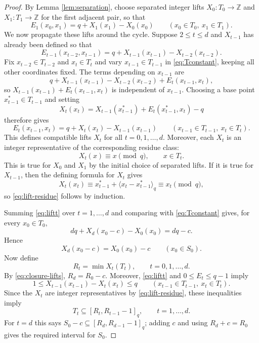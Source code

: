 \documentclass[10pt,a4paper]{amsart}
\begin{document}
\begin{proof}
By Lemma \ref{lem:separation}, choose separated integer lifts $X_0:T_0\to\mathbb Z$ and $X_1:T_1\to\mathbb Z$ for the first adjacent pair, so that
\begin{equation}
        E_1(x_0,x_1)=q+X_1(x_1)-X_0(x_0)
        \qquad(x_0\in T_0,
        \ x_1\in T_1).
        \label{eq:lift1}
\end{equation}
We now propagate these lifts around the cycle.  Suppose $2\le t\le d$ and $X_{t-1}$ has already been defined so that
\[
        E_{t-1}(x_{t-2},x_{t-1})
        =q+X_{t-1}(x_{t-1})-X_{t-2}(x_{t-2}).
\]
Fix $x_{t-2}\in T_{t-2}$ and $x_t\in T_t$ and vary $x_{t-1}\in T_{t-1}$ in \eqref{eq:Tconstant}, keeping all other coordinates fixed.  The terms depending on $x_{t-1}$ are
\[
        q+X_{t-1}(x_{t-1})-X_{t-2}(x_{t-2})
        +E_t(x_{t-1},x_t),
\]
so $X_{t-1}(x_{t-1})+E_t(x_{t-1},x_t)$ is independent of $x_{t-1}$.  Choosing a base point $x_{t-1}^*\in T_{t-1}$ and setting
\[
        X_t(x_t)=X_{t-1}(x_{t-1}^*)+E_t(x_{t-1}^*,x_t)-q
\]
therefore gives
\begin{equation}
        E_t(x_{t-1},x_t)=q+X_t(x_t)-X_{t-1}(x_{t-1})
        \qquad(x_{t-1}\in T_{t-1},
        \ x_t\in T_t).
        \label{eq:liftt}
\end{equation}
This defines compatible lifts $X_t$ for all $t=0,1,\ldots,d$.  Moreover, each $X_t$ is an integer representative of the corresponding residue class:
\begin{equation}
        X_t(x)\equiv x\pmod q,
        \qquad x\in T_t .
        \label{eq:lift-residue}
\end{equation}
This is true for $X_0$ and $X_1$ by the initial choice of separated lifts.  If it is true for $X_{t-1}$, then the defining formula for $X_t$ gives
\[
        X_t(x_t)\equiv x_{t-1}^*+\langle x_t-x_{t-1}^*\rangle_q\equiv x_t\pmod q,
\]
so \eqref{eq:lift-residue} follows by induction.

Summing \eqref{eq:liftt} over $t=1,\ldots,d$ and comparing with \eqref{eq:Tconstant} gives, for every $x_0\in T_0$,
\[
        dq+X_d(x_0-c)-X_0(x_0)=dq-c .
\]
Hence
\begin{equation}
        X_d(x_0-c)=X_0(x_0)-c
        \qquad(x_0\in S_0).
        \label{eq:closure-lifts}
\end{equation}
Now define
\[
        R_t=\min X_t(T_t),
        \qquad t=0,1,\ldots,d .
\]
By \eqref{eq:closure-lifts}, $R_d=R_0-c$.  Moreover, \eqref{eq:liftt} and $0\le E_t\le q-1$ imply
\[
        1\le X_{t-1}(x_{t-1})-X_t(x_t)\le q
        \qquad(x_{t-1}\in T_{t-1},
        \ x_t\in T_t).
\]
Since the $X_t$ are integer representatives by \eqref{eq:lift-residue}, these inequalities imply
\begin{equation}
        T_t\subseteq [R_t,R_{t-1}-1]_q,
        \qquad t=1,\ldots,d .
        \label{eq:nec-lift-inclusion}
\end{equation}
For $t=d$ this says $S_0-c\subseteq [R_d,R_{d-1}-1]_q$; adding $c$ and using $R_d+c=R_0$ gives the required interval for $S_0$.


\end{proof}
\end{document}
